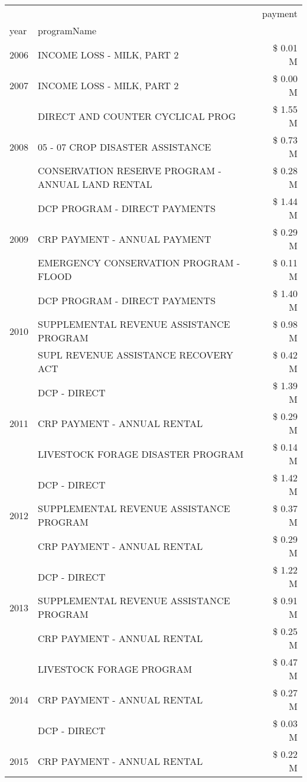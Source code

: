 \begin{tabular}{llr}
\toprule
 &  & payment \\
year & programName &  \\
\midrule
2006 & INCOME LOSS - MILK, PART 2 & \$ 0.01 M \\
\cline{1-3}
2007 & INCOME LOSS - MILK, PART 2 & \$ 0.00 M \\
\cline{1-3}
\multirow[t]{3}{*}{2008} & DIRECT AND COUNTER CYCLICAL PROG & \$ 1.55 M \\
 & 05 - 07 CROP DISASTER ASSISTANCE & \$ 0.73 M \\
 & CONSERVATION RESERVE PROGRAM - ANNUAL LAND RENTAL & \$ 0.28 M \\
\cline{1-3}
\multirow[t]{3}{*}{2009} & DCP PROGRAM - DIRECT PAYMENTS & \$ 1.44 M \\
 & CRP PAYMENT - ANNUAL PAYMENT & \$ 0.29 M \\
 & EMERGENCY CONSERVATION PROGRAM - FLOOD & \$ 0.11 M \\
\cline{1-3}
\multirow[t]{3}{*}{2010} & DCP PROGRAM - DIRECT PAYMENTS & \$ 1.40 M \\
 & SUPPLEMENTAL REVENUE ASSISTANCE PROGRAM & \$ 0.98 M \\
 & SUPL REVENUE ASSISTANCE RECOVERY ACT & \$ 0.42 M \\
\cline{1-3}
\multirow[t]{3}{*}{2011} & DCP - DIRECT & \$ 1.39 M \\
 & CRP PAYMENT - ANNUAL RENTAL & \$ 0.29 M \\
 & LIVESTOCK FORAGE DISASTER PROGRAM & \$ 0.14 M \\
\cline{1-3}
\multirow[t]{3}{*}{2012} & DCP - DIRECT & \$ 1.42 M \\
 & SUPPLEMENTAL REVENUE ASSISTANCE PROGRAM & \$ 0.37 M \\
 & CRP PAYMENT - ANNUAL RENTAL & \$ 0.29 M \\
\cline{1-3}
\multirow[t]{3}{*}{2013} & DCP - DIRECT & \$ 1.22 M \\
 & SUPPLEMENTAL REVENUE ASSISTANCE PROGRAM & \$ 0.91 M \\
 & CRP PAYMENT - ANNUAL RENTAL & \$ 0.25 M \\
\cline{1-3}
\multirow[t]{3}{*}{2014} & LIVESTOCK FORAGE PROGRAM & \$ 0.47 M \\
 & CRP PAYMENT - ANNUAL RENTAL & \$ 0.27 M \\
 & DCP - DIRECT & \$ 0.03 M \\
\cline{1-3}
\multirow[t]{3}{*}{2015} & CRP PAYMENT - ANNUAL RENTAL & \$ 0.22 M \\

\end{tabular}
